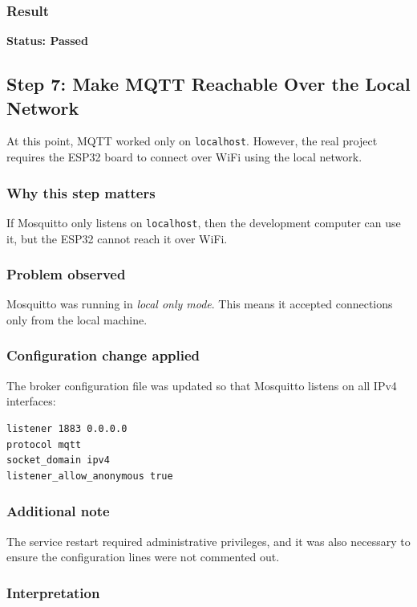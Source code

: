 \documentclass[12pt,a4paper]{article}
\begin{document}
\subsubsection*{Result}

\textbf{Status: Passed}

\subsection{Step 7: Make MQTT Reachable Over the Local Network}

At this point, MQTT worked only on \texttt{localhost}. However, the real
project requires the ESP32 board to connect over WiFi using the local network.

\subsubsection*{Why this step matters}

If Mosquitto only listens on \texttt{localhost}, then the development computer
can use it, but the ESP32 cannot reach it over WiFi.

\subsubsection*{Problem observed}

Mosquitto was running in \textit{local only mode}. This means it accepted
connections only from the local machine.

\subsubsection*{Configuration change applied}

The broker configuration file was updated so that Mosquitto listens on all IPv4
interfaces:

\begin{lstlisting}
listener 1883 0.0.0.0
protocol mqtt
socket_domain ipv4
listener_allow_anonymous true
\end{lstlisting}

\subsubsection*{Additional note}

The service restart required administrative privileges, and it was also
necessary to ensure the configuration lines were not commented out.

\subsubsection*{Interpretation}
\end{document}
